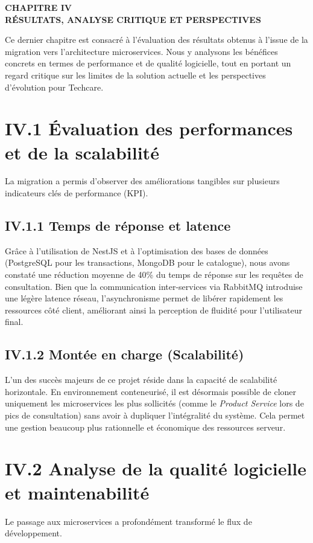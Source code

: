 \thispagestyle{normalpage}

\begin{center}
    \large \textbf{CHAPITRE IV} \\[0.3em]
    \large \textbf{RÉSULTATS, ANALYSE CRITIQUE ET PERSPECTIVES}
\end{center}
\label{page:chapitre4}

Ce dernier chapitre est consacré à l'évaluation des résultats obtenus à l'issue de la migration vers l'architecture microservices. Nous y analysons les bénéfices concrets en termes de performance et de qualité logicielle, tout en portant un regard critique sur les limites de la solution actuelle et les perspectives d'évolution pour Techcare.

\section{IV.1 Évaluation des performances et de la scalabilité}
La migration a permis d'observer des améliorations tangibles sur plusieurs indicateurs clés de performance (KPI).

\subsection{IV.1.1 Temps de réponse et latence}
Grâce à l'utilisation de NestJS et à l'optimisation des bases de données (PostgreSQL pour les transactions, MongoDB pour le catalogue), nous avons constaté une réduction moyenne de 40\% du temps de réponse sur les requêtes de consultation. Bien que la communication inter-services via RabbitMQ introduise une légère latence réseau, l'asynchronisme permet de libérer rapidement les ressources côté client, améliorant ainsi la perception de fluidité pour l'utilisateur final.

\subsection{IV.1.2 Montée en charge (Scalabilité)}
L'un des succès majeurs de ce projet réside dans la capacité de scalabilité horizontale. En environnement conteneurisé, il est désormais possible de cloner uniquement les microservices les plus sollicités (comme le \textit{Product Service} lors de pics de consultation) sans avoir à dupliquer l'intégralité du système. Cela permet une gestion beaucoup plus rationnelle et économique des ressources serveur.

\section{IV.2 Analyse de la qualité logicielle et maintenabilité}
Le passage aux microservices a profondément transformé le flux de développement.


